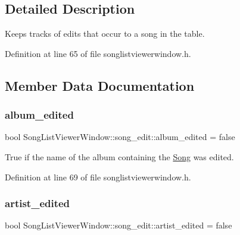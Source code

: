 \subsection{Detailed Description}
Keeps tracks of edits that occur to a song in the table. 

Definition at line 65 of file songlistviewerwindow.\+h.



\subsection{Member Data Documentation}
\mbox{\label{struct_song_list_viewer_window_1_1song__edit_ac78cf078f8fb2fb5d482c80cff7bc860}} 
\subsubsection{\texorpdfstring{album\+\_\+edited}{album\_edited}}
{\footnotesize\ttfamily bool Song\+List\+Viewer\+Window\+::song\+\_\+edit\+::album\+\_\+edited = false}



True if the name of the album containing the \mbox{\hyperlink{class_song}{Song}} was edited. 



Definition at line 69 of file songlistviewerwindow.\+h.

\mbox{\label{struct_song_list_viewer_window_1_1song__edit_ac5afb4d077978f41b62842de638ab60c}} 
\subsubsection{\texorpdfstring{artist\+\_\+edited}{artist\_edited}}
{\footnotesize\ttfamily bool Song\+List\+Viewer\+Window\+::song\+\_\+edit\+::artist\+\_\+edited = false}



